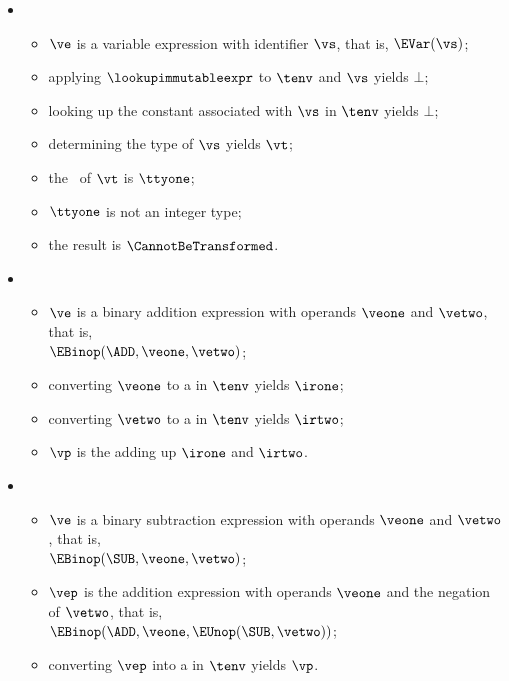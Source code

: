 \begin{itemize}
  \item {}
  \begin{itemize}
    \item $\ve$ is a variable expression with identifier $\vs$, that is, $\EVar(\vs)$;
    \item applying $\lookupimmutableexpr$ to $\tenv$ and $\vs$ yields $\bot$;
    \item looking up the constant associated with $\vs$ in $\tenv$ yields $\bot$;
    \item determining the type of $\vs$ yields $\vt$\ProseOrTypeError;
    \item the \underlyingtypeterm\ of $\vt$ is $\ttyone$\ProseOrTypeError;
    \item $\ttyone$ is not an integer type;
    \item the result is $\CannotBeTransformed$.
  \end{itemize}

  \item {}
  \begin{itemize}
    \item $\ve$ is a binary addition expression with operands $\veone$ and $\vetwo$, that is, \\ $\EBinop(\ADD, \veone, \vetwo)$;
    \item converting $\veone$ to a \symbolicexpressionterm{} in $\tenv$ yields $\irone$\ProseOrTypeErrorOrCannotBeTransformed;
    \item converting $\vetwo$ to a \symbolicexpressionterm{} in $\tenv$ yields $\irtwo$\ProseOrTypeErrorOrCannotBeTransformed;
    \item $\vp$ is the \symbolicexpressionterm{} adding up $\irone$ and $\irtwo$.
  \end{itemize}

  \item {}
  \begin{itemize}
    \item $\ve$ is a binary subtraction expression with operands $\veone$ and $\vetwo$, that is, \\ $\EBinop(\SUB, \veone, \vetwo)$;
    \item $\vep$ is the addition expression with operands $\veone$ and the negation of $\vetwo$, that is, \\ $\EBinop(\ADD, \veone, \EUnop(\SUB, \vetwo))$;
    \item converting $\vep$ into a \symbolicexpressionterm{} in $\tenv$ yields $\vp$\ProseOrTypeErrorOrCannotBeTransformed.
  \end{itemize}


\end{itemize}
